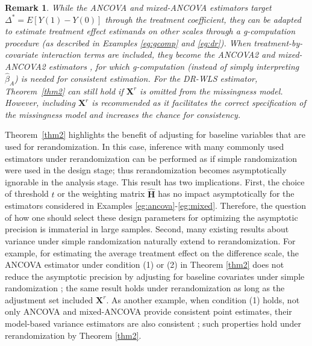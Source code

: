 \documentclass[12pt]{article}
\newtheorem{remark}{Remark}
\newcommand{\bX}{\boldsymbol{X}}\newcommand{\bO}{\boldsymbol{O}}
\begin{document}
\begin{remark}
While the ANCOVA and mixed-ANCOVA estimators target $\Delta^* = E[Y(1)-Y(0)]$ through the treatment coefficient, they can be adapted to estimate treatment effect estimands on other scales through a g-computation procedure (as described in Examples \ref{eg:gcomp} and \ref{eg:dr}). When treatment-by-covariate interaction terms are included, they become the ANCOVA2 \citep{Tsiatis2008} and mixed-ANCOVA2 estimators \citep{wang2021mixed}, for which g-computation (instead of simply interpreting $\widehat{\beta}_A$) is needed for consistent estimation. {For the DR-WLS estimator, Theorem~\ref{thm2} can still hold if $\bX^r$ is omitted from the missingness model. However, including $\bX^r$ is recommended as it facilitates the correct specification of the missingness model and increases the chance for consistency. 
}
\end{remark}

Theorem~\ref{thm2} highlights the benefit of adjusting for baseline variables that are used for rerandomization. In this case, inference with many commonly used estimators under rerandomization can be performed as if simple randomization were used in the design stage; thus rerandomization becomes asymptotically ignorable in the analysis stage. This result has two implications. First, the choice of threshold $t$ or the weighting matrix $\widehat{\mathbf{H}}$ has no impact asymptotically for the estimators considered in Examples \ref{eg:ancova}-\ref{eg:mixed}. Therefore, the question of how one should select these design parameters for optimizing the asymptotic precision is immaterial in large samples. Second, many existing results about variance under simple randomization naturally extend to rerandomization. For example, for estimating the average treatment effect on the difference scale, the ANCOVA estimator under condition (1) or (2) in Theorem \ref{thm2} does not reduce the asymptotic precision by adjusting for baseline covariates under simple randomization \citep{Tsiatis2008}; the same result holds under rerandomization as long as the adjustment set included $\bX^r$. As another example, when condition (1) holds, not only ANCOVA and mixed-ANCOVA provide consistent point estimates, their model-based variance estimators are also consistent \citep{wang2019analysis,wang2021mixed}; such properties hold under rerandomization by Theorem \ref{thm2}. 
\end{document}
